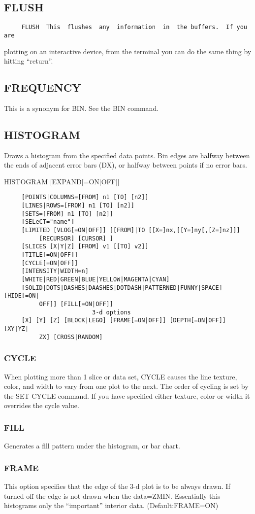 \subsection{FLUSH}
\begin{verbatim}
     FLUSH  This  flushes  any  information  in  the buffers.  If you are
\end{verbatim}
plotting on an interactive device, from the terminal you can do the  same
thing by hitting ``return''.  
\subsection{FREQUENCY}
This is a synonym for BIN.  See the BIN command.  
\subsection{HISTOGRAM}
Draws  a histogram from the specified data points.  Bin edges are halfway
between the ends of adjacent error bars (DX), or halfway  between  points
if no error bars.  

HISTOGRAM [EXPAND[=ON$|$OFF]] 
\begin{verbatim}
     [POINTS|COLUMNS=[FROM] n1 [TO] [n2]] 
     [LINES|ROWS=[FROM] n1 [TO] [n2]] 
     [SETS=[FROM] n1 [TO] [n2]] 
     [SELeCT="name"] 
     [LIMITED [VLOG[=ON|OFF]] [[FROM]|TO [[X=]nx,[[Y=]ny[,[Z=]nz]]]
          [RECURSOR] [CURSOR] ] 
     [SLICES [X|Y|Z] [FROM] v1 [[TO] v2]] 
     [TITLE[=ON|OFF]] 
     [CYCLE[=ON|OFF]] 
     [INTENSITY|WIDTH=n] 
     [WHITE|RED|GREEN|BLUE|YELLOW|MAGENTA|CYAN] 
     [SOLID|DOTS|DASHES|DAASHES|DOTDASH|PATTERNED|FUNNY|SPACE] [HIDE[=ON|
          OFF]] [FILL[=ON|OFF]] 
                         3-d options 
     [X] [Y] [Z] [BLOCK|LEGO] [FRAME[=ON|OFF]] [DEPTH[=ON|OFF]] [XY|YZ|
          ZX] [CROSS|RANDOM] 
\end{verbatim}
\subsubsection{CYCLE}
When  plotting  more  than  1  slice or data set, CYCLE causes the line
texture, color, and width to vary from one plot to the next.  The order
of  cycling  is  set  by  the SET CYCLE command.  If you have specified
either texture, color or width it overrides the cycle value.  
\subsubsection{FILL}
Generates a fill pattern under the histogram, or bar chart.  
\subsubsection{FRAME}
This  option  specifies  that  the edge of the 3-d plot is to be always
drawn.  If turned off  the  edge  is  not  drawn  when  the  data=ZMIN.
Essentially this histograms only the ``important'' interior data.  
(Default:FRAME=ON) 
